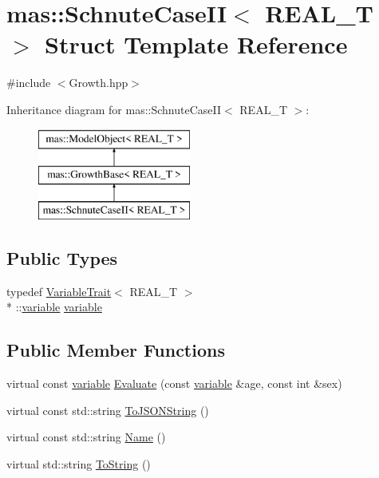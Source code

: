 \hypertarget{structmas_1_1_schnute_case_i_i}{\section{mas\-:\-:Schnute\-Case\-I\-I$<$ R\-E\-A\-L\-\_\-\-T $>$ Struct Template Reference}
\label{structmas_1_1_schnute_case_i_i}
}


{\ttfamily \#include $<$Growth.\-hpp$>$}

Inheritance diagram for mas\-:\-:Schnute\-Case\-I\-I$<$ R\-E\-A\-L\-\_\-\-T $>$\-:\begin{figure}[H]
\begin{center}
\leavevmode
\includegraphics[height=3.000000cm]{structmas_1_1_schnute_case_i_i}
\end{center}
\end{figure}
\subsection*{Public Types}
\begin{DoxyCompactItemize}
\item 
typedef \hyperlink{structmas_1_1_variable_trait}{Variable\-Trait}$<$ R\-E\-A\-L\-\_\-\-T $>$\\*
\-::\hyperlink{structmas_1_1_schnute_case_i_i_a44a5def50d599f85b1c0fbe1b44f139b}{variable} \hyperlink{structmas_1_1_schnute_case_i_i_a44a5def50d599f85b1c0fbe1b44f139b}{variable}
\end{DoxyCompactItemize}
\subsection*{Public Member Functions}
\begin{DoxyCompactItemize}
\item 
virtual const \hyperlink{structmas_1_1_schnute_case_i_i_a44a5def50d599f85b1c0fbe1b44f139b}{variable} \hyperlink{structmas_1_1_schnute_case_i_i_ac582befc654cf955f0afafed8889b0e1}{Evaluate} (const \hyperlink{structmas_1_1_schnute_case_i_i_a44a5def50d599f85b1c0fbe1b44f139b}{variable} \&age, const int \&sex)
\item 
virtual const std\-::string \hyperlink{structmas_1_1_schnute_case_i_i_a291cd832a760d0a08e838fd251f98b2b}{To\-J\-S\-O\-N\-String} ()
\item 
virtual const std\-::string \hyperlink{structmas_1_1_schnute_case_i_i_a1f2900afe54ea24bcd555dd5eab8ce03}{Name} ()
\item 
virtual std\-::string \hyperlink{structmas_1_1_schnute_case_i_i_ac4cca4d5d808023e1a72651ea090fc58}{To\-String} ()
\end{DoxyCompactItemize}

